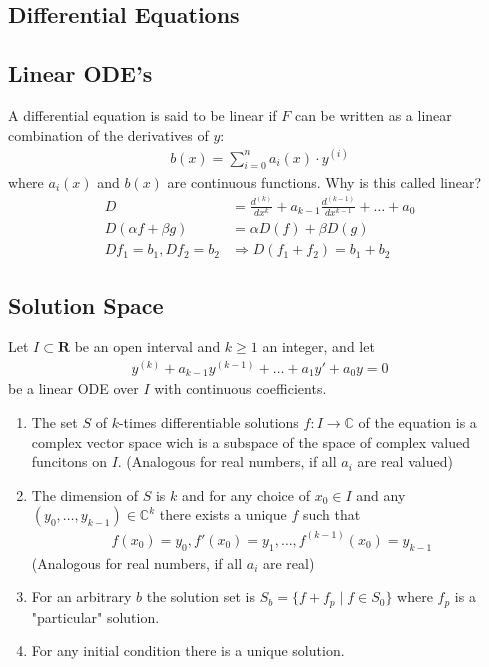 \documentclass[8pt]{extarticle}
\newcommand{\R}{{\mathbb R}}
\newcommand{\C}{{\mathbb C}}
\newcommand{\ra}{{\rightarrow}}
\def\R{\mathbf{R}}
\begin{document}
\setlength{\columnseprule}{0.4pt}
\begin{multicols*}{3}


  \section{Differential Equations}
  \hypertarget{sec:0}{}


  \subsection{Linear ODE's}
  A differential equation is said to be linear if $F$
  can be written as a linear combination of the derivatives of $y$:
  \begin{align*}
    b(x) = \sum_{i = 0}^{n} a_i(x) \cdot y^{(i)}
  \end{align*}
  where $a_i(x)$ and $b(x)$ are continuous functions. Why is
  this called linear?
  \begin{align*}
    D                      & = \frac{d^{(k)}}{dx^k} + a_{k-1} \frac{d^{(k-1)}}{dx^{k-1}} + \dots + a_0 \\
    D(\alpha f + \beta g)  & = \alpha D(f) + \beta D(g)                                                \\
    Df_1 = b_1, Df_2 = b_2 & \Rightarrow D(f_1 + f_2) = b_1 + b_2
  \end{align*}

  \subsection{Solution Space}
  Let $I \subset \R$ be an open interval
  and $k \geq 1$ an integer, and let
  \begin{align*}
    y^{(k)} + a_{k-1}y^{(k-1)} + \dots + a_1 y' + a_0 y = 0
  \end{align*}
  be a linear ODE over $I$ with continuous coefficients.
  \begin{enumerate}[label=(\arabic*)]
    \item The set $S$ of $k$-times differentiable solutions
          $f:I \ra \C$ of the equation is a complex
          vector space wich is a subspace of the space of complex valued
          funcitons on $I$. (Analogous for real numbers, if all
          $a_i$ are real valued)
    \item The dimension of $S$ is $k$ and for any choice of $x_0 \in I$
          and any $(y_0, \dots, y_{k-1}) \in \C^k$ there
          exists a unique $f$ such that
          \begin{align*}
            f(x_0) = y_0, f'(x_0) = y_1, \dots, f^{(k-1)}(x_0) = y_{k-1}
          \end{align*}
          (Analogous for real numbers, if all $a_i$ are real)
    \item For an arbitrary $b$ the solution set is
          $S_b = \{f + f_p \;|\; f \in S_0\}$ where $f_p$ is a "particular"
          solution.
    \item For any initial condition there is a unique solution.
  \end{enumerate}

\end{multicols*}
\end{document}

